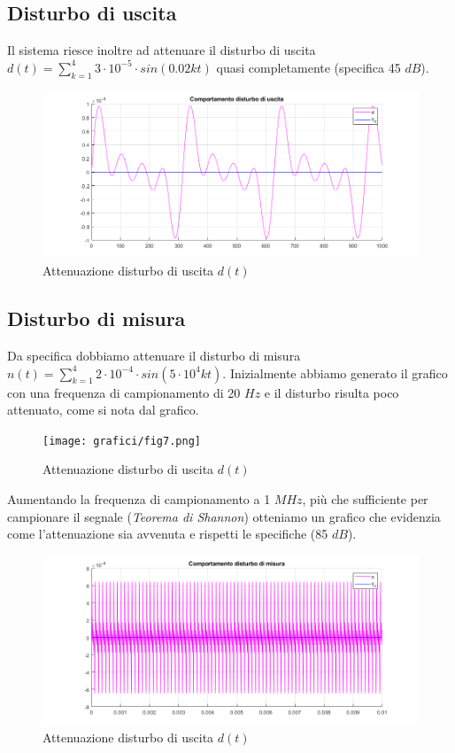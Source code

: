\documentclass{article}
\begin{document}
\subsection{Disturbo di uscita}
Il sistema riesce inoltre ad attenuare il disturbo di uscita $d(t)=\sum_{k=1}^4 3\cdot10^{-5}\cdot sin(0.02kt)$ quasi completamente (specifica 45 $dB$).
\begin{figure}[!h]
\centering
\includegraphics[width=1\textwidth]{grafici/fig5.png}
\caption{\label{fig:orbit}Attenuazione disturbo di uscita $d(t)$}
\end{figure}

\subsection{Disturbo di misura}
Da specifica dobbiamo attenuare il disturbo di misura $n(t)=\sum_{k=1}^4 2\cdot10^{-4}\cdot sin(5\cdot 10^4kt)$. Inizialmente abbiamo generato il grafico con una frequenza di campionamento di 20 $Hz$ e il disturbo risulta poco attenuato, come si nota dal grafico.
\\
\begin{figure}[!h]
\centering
\texttt{[image: grafici/fig7.png]}
\caption{\label{fig:orbit}Attenuazione disturbo di uscita $d(t)$}
\end{figure}

Aumentando la frequenza di campionamento a 1 $MHz$, più che sufficiente per campionare il segnale 
(\textit{Teorema di Shannon}) otteniamo un grafico che evidenzia come l'attenuazione sia avvenuta e rispetti le specifiche (85 $dB$).

\begin{figure}[!h]
\centering
\includegraphics[width=1\textwidth]{grafici/fig6.png}
\caption{\label{fig:orbit}Attenuazione disturbo di uscita $d(t)$}
\end{figure}
\end{document}
